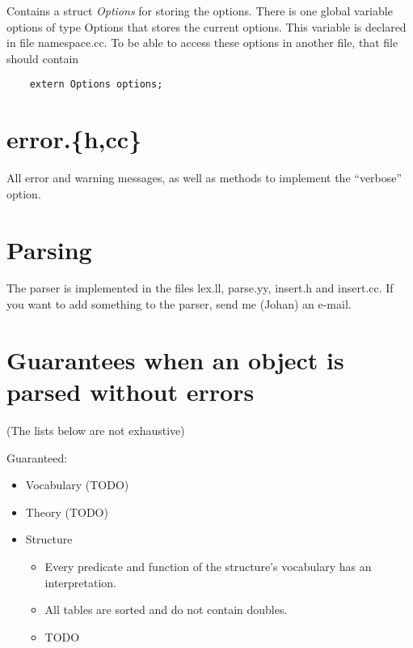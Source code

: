 \documentclass{article}
\begin{document}
Contains a struct \emph{Options} for storing the options. There is one global variable options of type Options that stores the current options. This variable is declared in file namespace.cc. To be able to access these options in another file, that file should contain 
\begin{lstlisting}
	extern Options options;
\end{lstlisting}

\section{error.\{h,cc\}}

All error and warning messages, as well as methods to implement the ``verbose'' option.

\section{Parsing}

The parser is implemented in the files lex.ll, parse.yy, insert.h and insert.cc. If you want to add something to the parser, send me (Johan) an e-mail.

\section{Guarantees when an object is parsed without errors}

(The lists below are not exhaustive)

Guaranteed:
\begin{itemize}
	\item Vocabulary (TODO)
	\item Theory (TODO)
	\item Structure
	\begin{itemize}
		\item Every predicate and function of the structure's vocabulary has an interpretation.
		\item All tables are sorted and do not contain doubles.
		\item TODO
	\end{itemize}
\end{itemize}
\end{document}
